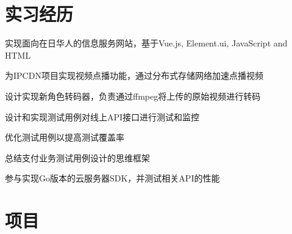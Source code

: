 \documentclass[]{deedy-resume-openfont}
\begin{document}
\begin{minipage}[t]{0.73\textwidth} 


\section{实习经历}

\vspace{\topsep}
\begin{tightemize}
    \item 实现面向在日华人的信息服务网站，基于Vue.js, Element.ui, JavaScript and HTML 
\end{tightemize}
\sectionsep

\vspace{\topsep}
\begin{tightemize}
    \item 为IPCDN项目实现视频点播功能，通过分布式存储网络加速点播视频
    \item 设计实现新角色转码器，负责通过ffmpeg将上传的原始视频进行转码
\end{tightemize}
\sectionsep

\begin{tightemize}
\item 设计和实现测试用例对线上API接口进行测试和监控
\item 优化测试用例以提高测试覆盖率
\item 总结支付业务测试用例设计的思维框架
\end{tightemize}
\sectionsep

\begin{tightemize}
\item 参与实现Go版本的云服务器SDK，并测试相关API的性能
\end{tightemize}
\sectionsep


\section{项目}


\end{minipage}
\end{document}
